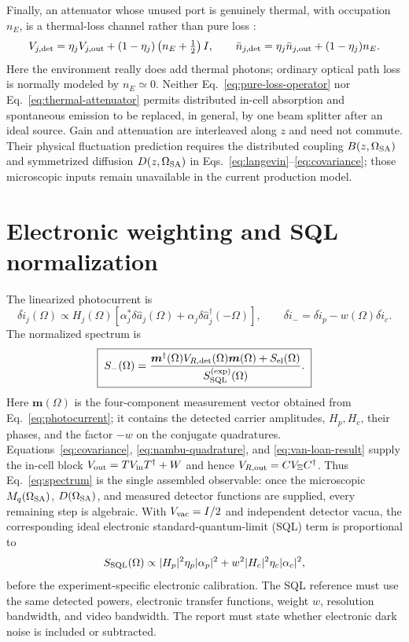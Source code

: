 \documentclass[11pt,a4paper]{article}
\begin{document}
Finally, an attenuator whose unused port is genuinely thermal, with occupation
$n_E$, is a thermal-loss channel rather than pure loss \cite{Lami2020,Xiang2017}:
\begin{equation}
 V_{j,{\rm det}}=\eta_j V_{j,{\rm out}}
 +(1-\eta_j)\left(n_E+\tfrac12\right)I,
 \qquad
 \bar n_{j,{\rm det}}=\eta_j\bar n_{j,{\rm out}}+(1-\eta_j)n_E .
 \label{eq:thermal-attenuator}
\end{equation}
Here the environment really does add thermal photons; ordinary optical path
loss is normally modeled by $n_E\simeq0$.  Neither Eq.~\eqref{eq:pure-loss-operator}
nor Eq.~\eqref{eq:thermal-attenuator} permits distributed in-cell absorption and
spontaneous emission to be replaced, in general, by one beam splitter after an
ideal source.  Gain and attenuation are interleaved along $z$ and need not
commute.  Their physical fluctuation prediction requires the distributed
coupling $B(z,\Omega_{\rm SA})$ and symmetrized diffusion
$D(z,\Omega_{\rm SA})$ in Eqs.~\eqref{eq:langevin}--\eqref{eq:covariance}; those
microscopic inputs remain unavailable in the current production model.

\section{Electronic weighting and SQL normalization}

The linearized photocurrent is
\begin{equation}
\delta\hat i_j(\Omega)\propto H_j(\Omega)
\left[\alpha_j^*\delta\hat a_j(\Omega)
+\alpha_j\delta\hat a_j^\dagger(-\Omega)\right],
\qquad
\delta\hat i_-=\delta\hat i_p-w(\Omega)\delta\hat i_c .
\label{eq:photocurrent}
\end{equation}
The normalized spectrum is
\begin{equation}
\boxed{\;
S_-(\Omega)=
\frac{\bm m^\dagger(\Omega)V_{R,\rm det}(\Omega)\bm m(\Omega)
+S_{\rm el}(\Omega)}
{S_{\rm SQL}^{(\rm exp)}(\Omega)} .\;}
\label{eq:spectrum}
\end{equation}
Here $\bm m(\Omega)$ is the four-component measurement vector obtained from
Eq.~\eqref{eq:photocurrent}; it contains the detected carrier amplitudes,
$H_p,H_c$, their phases, and the factor $-w$ on the conjugate quadratures.
Equations~\eqref{eq:covariance}, \eqref{eq:nambu-quadrature}, and
\eqref{eq:van-loan-result} supply the in-cell block
$V_{\rm out}=T V_{\rm in}T^\dagger+W$ and hence
$V_{R,\rm out}=CV_\Xi C^\dagger$. Thus Eq.~\eqref{eq:spectrum} is the single
assembled observable: once the microscopic
$M_q(\Omega_{\rm SA})$, $D(\Omega_{\rm SA})$, and measured detector functions
are supplied, every remaining step is algebraic.
With $V_{\rm vac}=I/2$ and independent detector vacua, the corresponding
ideal electronic standard-quantum-limit (SQL) term is proportional to
\[
S_{\rm SQL}(\Omega)\propto
|H_p|^2\eta_p|\alpha_p|^2+
w^2|H_c|^2\eta_c|\alpha_c|^2 ,
\]
before the experiment-specific electronic calibration.
The SQL reference must use the same detected powers, electronic
transfer functions, weight $w$, resolution bandwidth, and video bandwidth.
The report must state whether electronic dark noise is included or subtracted.
\end{document}
